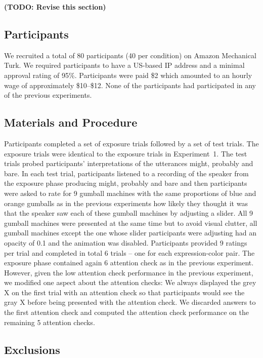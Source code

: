 \documentclass[lucida,biblatex]{sp} %
\newcommand{\todo}[1]{}
\renewcommand{\todo}[1]{{\bf \color{red} (TODO: {#1})}}
\begin{document}
\todo{Revise this section}

\subsection{Participants}

We recruited a total of 80 participants (40 per condition) on Amazon Mechanical Turk. We required participants to have a US-based IP address and a minimal approval rating of 95\%. Participants were paid \$2 which amounted to an hourly wage of approximately \$10--\$12. None of the participants had participated in any of the previous experiments. 

\subsection{Materials and Procedure}

Participants completed a set of exposure trials followed by a set of test trials. The exposure trials were identical to the exposure trials in Experiment~1. The test trials probed participants' interpretations of the utterances {\sc might}, {\sc probably} and {\sc bare}. In each test trial, participants listened to a recording of the speaker from the exposure phase producing {\sc might}, {\sc probably} and {\sc bare} and then participants were asked to rate for 9 gumball machines with the same proportions of blue and orange gumballs as in the previous experiments how likely they thought it was that the speaker saw each of these gumball machines by adjusting a slider. All 9 gumball machines were presented at the same time but to avoid visual clutter, all gumball machines except the one whose slider participants were adjusting had an opacity of 0.1 and the animation was disabled. Participants provided 9 ratings per trial and completed in total 6 trials -- one for each expression-color pair. The exposure phase contained again 6 attention check as in the previous experiment. However, given the low attention check performance in the previous experiment, we modified one aspect about the attention checks: We always displayed the grey X on the first trial with an attention check so that participants would see the gray X before being presented with the attention check. We discarded answers to the first attention check and computed the attention check performance on the remaining 5 attention checks.

\subsection{Exclusions}
\end{document}
